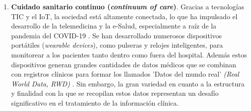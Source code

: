 \begin{enumerate}

\item \textbf{Cuidado sanitario continuo (\textit{continuum of care})}. Gracias a tecnologías TIC y el IoT, la sociedad está altamente conectada, lo que ha impulsado el desarrollo de la telemedicina y la e-Salud, especialmente a raíz de la pandemia del COVID-19 \cite{martin2021ehealth}. Se han desarrollado numerosos dispositivos portátiles (\textit{wearable devices}), como pulseras y relojes inteligentes, para monitorear a los pacientes tanto dentro como fuera del hospital. Además estos dispositivos generan grandes cantidades de datos médicos que se combinan con registros clínicos para formar los llamados 'Datos del mundo real' \textit{(Real World Data, RWD)} \cite{kouroubali2019new}. Sin embargo, la gran variedad en cuanto a la estructura y finalidad con la que se recopilan estos datos representan un desafío significativo en el tratamiento de la información clínica.



\end{enumerate}
